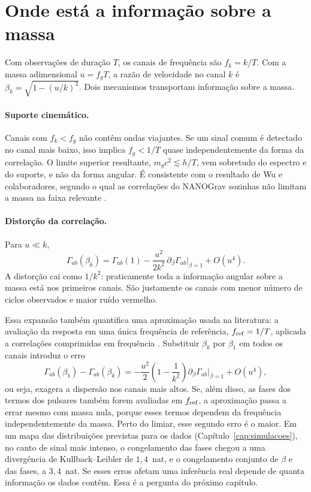 \section{Onde está a informação sobre a massa}
\label{sec:pta-informacao}

Com observações de duração $T$, os canais de frequência são
$f_k=k/T$. Com a massa adimensional $u=f_gT$, a razão de velocidade no
canal $k$ é $\beta_k=\sqrt{1-(u/k)^2}$. Dois mecanismos transportam
informação sobre a massa.

\paragraph{Suporte cinemático.} Canais com $f_k<f_g$ não contêm ondas
viajantes. Se um sinal comum é detectado no canal mais baixo, isso
implica $f_g<1/T$ quase independentemente da forma da correlação. O
limite superior resultante, $m_gc^2\lesssim h/T$, vem sobretudo do
espectro e do suporte, e não da forma angular. É consistente com o
resultado de Wu e colaboradores, segundo o qual as correlações do
NANOGrav sozinhas não limitam a massa na faixa relevante
\autocite{wu2024}.

\paragraph{Distorção da correlação.} Para $u\ll k$,
\begin{equation}
 \Gamma_{ab}(\beta_k)=\Gamma_{ab}(1)
 -\frac{u^2}{2k^2}\,\partial_\beta\Gamma_{ab}\big|_{\beta=1}
 +O(u^4).
 \label{eq:pta-fraca}
\end{equation}
A distorção cai como $1/k^2$: praticamente toda a informação angular
sobre a massa está nos primeiros canais. São justamente os canais com
menor número de ciclos observados e maior ruído vermelho.

Essa expansão também quantifica uma aproximação usada na literatura: a
avaliação da resposta em uma única frequência de referência,
$f_{\rm ref}=1/T$, aplicada a correlações comprimidas em frequência
\autocite{zhao2026}. Substituir $\beta_k$ por $\beta_1$ em todos os
canais introduz o erro
\begin{equation}
 \Gamma_{ab}(\beta_1)-\Gamma_{ab}(\beta_k)
 =-\frac{u^2}{2}\left(1-\frac{1}{k^2}\right)
 \partial_\beta\Gamma_{ab}\big|_{\beta=1}+O(u^4),
 \label{eq:pta-fref}
\end{equation}
ou seja, exagera a dispersão nos canais mais altos. Se, além disso, as
fases dos termos dos pulsares também forem avaliadas em $f_{\rm ref}$, a
aproximação passa a errar mesmo com massa nula, porque esses termos
dependem da frequência independentemente da massa. Perto do limiar, esse
segundo erro é o maior. Em um mapa das distribuições previstas para os
dados (Capítulo~\ref{cap:simulacoes}), no canto de sinal mais intenso,
o congelamento das fases chegou a uma divergência de Kullback--Leibler
de $1{,}4$~nat, e o congelamento conjunto de $\beta$ e das fases, a
$3{,}4$~nat. Se esses erros
afetam uma inferência real depende de quanta informação os dados contêm.
Essa é a pergunta do próximo capítulo.
